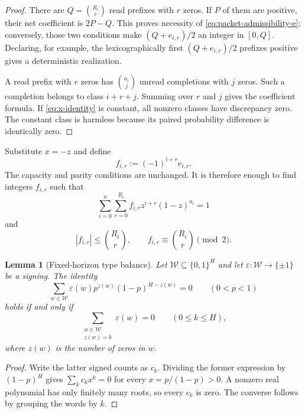\documentclass[11pt]{article}
\newtheorem{lemma}[theorem]{Lemma}
\theoremstyle{definition}
\theoremstyle{remark}
\begin{document}
\begin{proof}
There are $Q=\binom{R_i}{r}$ read prefixes with $r$ zeros.  If $P$ of them are positive, their net coefficient is $2P-Q$.  This proves necessity of \eqref{eq:packet-admissibility-e}; conversely, those two conditions make $(Q+e_{i,r})/2$ an integer in $[0,Q]$.  Declaring, for example, the lexicographically first $(Q+e_{i,r})/2$ prefixes positive gives a deterministic realization.

A read prefix with $r$ zeros has $\binom{a_i}{j}$ unread completions with $j$ zeros.  Such a completion belongs to class $i+r+j$.  Summing over $r$ and $j$ gives the coefficient formula.  If \eqref{eq:x-identity} is constant, all nonzero classes have discrepancy zero.  The constant class is harmless because its paired probability difference is identically zero.
\end{proof}

Substitute $x=-z$ and define
\[
 f_{i,r}:=(-1)^{i+r}e_{i,r}.
\]
The capacity and parity conditions are unchanged.  It is therefore enough to find integers $f_{i,r}$ such that
\begin{equation}\label{eq:target-identity}
 \sum_{i=0}^{n}\sum_{r=0}^{R_i}
 f_{i,r}z^{i+r}(1-z)^{a_i}=1
\end{equation}
and
\begin{equation}\label{eq:packet-admissibility}
 |f_{i,r}|\le\binom{R_i}{r},
 \qquad
 f_{i,r}\equiv\binom{R_i}{r}\pmod2.
\end{equation}

\begin{lemma}[Fixed-horizon type balance]\label{lem:type-balance}
Let $\mathcal W\subseteq\{0,1\}^{H}$ and let
$\varepsilon:\mathcal W\to\{\pm1\}$ be a signing. The identity
\[
 \sum_{w\in\mathcal W}\varepsilon(w)p^{z(w)}(1-p)^{H-z(w)}=0
 \qquad(0<p<1)
\]
holds if and only if
\begin{equation}\label{eq:type-balance}
 \sum_{\substack{w\in\mathcal W\\z(w)=k}}\varepsilon(w)=0
 \qquad(0\le k\le H),
\end{equation}
where $z(w)$ is the number of zeros in $w$.
\end{lemma}
\begin{proof}
Write the latter signed counts as $c_k$. Dividing the former expression
by $(1-p)^H$ gives $\sum_k c_k x^k=0$ for every
$x=p/(1-p)>0$. A nonzero real polynomial has only finitely many roots,
so every $c_k$ is zero. The converse follows by grouping the words by $k$.
\end{proof}
\end{document}
